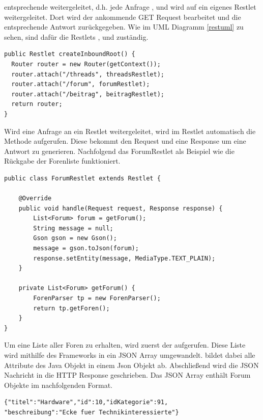 entsprechende  weitergeleitet, d.h. jede Anfrage 
,  und  wird auf ein eigenes Restlet
weitergeleitet. Dort wird der ankommende GET Request bearbeitet und die
entsprechende Antwort zurückgegeben. Wie im UML Diagramm \ref{restuml} zu sehen,
sind dafür die Restlets ,  und
 zuständig. 
\begin{lstlisting}[caption=Routing der Restlets, label=routing]
public Restlet createInboundRoot() {
  Router router = new Router(getContext());
  router.attach("/threads", threadsRestlet);
  router.attach("/forum", forumRestlet);
  router.attach("/beitrag", beitragRestlet);
  return router;
}
\end{lstlisting}
Wird eine Anfrage an ein Restlet weitergeleitet, wird im Restlet automatisch die
Methode  aufgerufen. Diese bekommt den Request und eine
Response um eine Antwort zu generieren. Nachfolgend das ForumRestlet als
Beispiel wie die Rückgabe der Forenliste funktioniert.
\begin{lstlisting}[caption=Funktionsweise des ForumRestlet, label=forumrestlet]
public class ForumRestlet extends Restlet {

	@Override
    public void handle(Request request, Response response) {
		List<Forum> forum = getForum();
        String message = null;
        Gson gson = new Gson();
        message = gson.toJson(forum);
        response.setEntity(message, MediaType.TEXT_PLAIN);
    }
    
	private List<Forum> getForum() {
		ForenParser tp = new ForenParser();
		return tp.getForen();
	}
}
\end{lstlisting}
Um eine Liste aller Foren zu erhalten, wird zuerst der 
aufgerufen. Diese Liste wird mithilfe des Frameworks  in ein
JSON Array umgewandelt.  bildet dabei alle Attribute des Java
Objekt in einem Json Objekt ab. Abschließend wird die JSON Nachricht in die HTTP
Response geschrieben. Das JSON Array enthält Forum Objekte im
nachfolgenden Format. 
\begin{lstlisting}[caption=Format der Forum Objekte,label=jsonforum] 
{"titel":"Hardware","id":10,"idKategorie":91,
"beschreibung":"Ecke fuer Technikinteressierte"}
\end{lstlisting}
